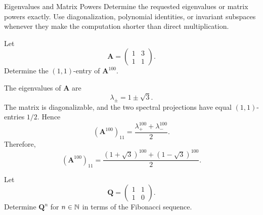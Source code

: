     \begin{expectedproblemgroup}{Eigenvalues and Matrix Powers}
        Determine the requested eigenvalues or matrix powers exactly. Use
        diagonalization, polynomial identities, or invariant subspaces whenever
        they make the computation shorter than direct multiplication.

        \begin{expectedsubproblem}[1997 VTRMC]
            Let
            \[
                \mathbf{A}
                =
                \begin{pmatrix}
                    1 & 3\\
                    1 & 1
                \end{pmatrix}.
            \]
            Determine the $(1,1)$-entry of $\mathbf{A}^{100}$.
        \end{expectedsubproblem}

        \begin{expectedsubsolution}
            The eigenvalues of $\mathbf{A}$ are
            \[
                \lambda_\pm=1\pm\sqrt3.
            \]
            The matrix is diagonalizable, and the two spectral projections have
            equal $(1,1)$-entries $1/2$. Hence
            \[
                (\mathbf{A}^{100})_{11}
                =
                \frac{\lambda_+^{100}+\lambda_-^{100}}{2}.
            \]
            Therefore,
            \[
                \boxed{
                    (\mathbf{A}^{100})_{11}
                    =
                    \frac{(1+\sqrt3)^{100}+(1-\sqrt3)^{100}}{2}
                }.
            \]
        \end{expectedsubsolution}

        \begin{expectedsubproblem}
            Let
            \[
                \mathbf{Q}
                =
                \begin{pmatrix}
                    1 & 1\\
                    1 & 0
                \end{pmatrix}.
            \]
            Determine $\mathbf{Q}^n$ for $n\in\mathbb{N}$ in terms of the Fibonacci
            sequence.
        \end{expectedsubproblem}


\end{expectedproblemgroup}
